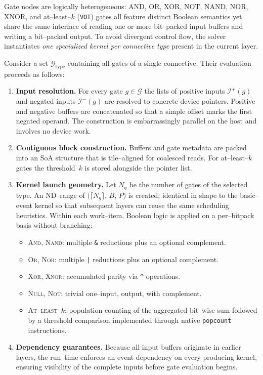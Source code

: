 Gate nodes are logically heterogeneous: AND, OR, XOR, NOT, NAND, NOR, XNOR, and
at--least--$k$ (\texttt{VOT}) gates all feature distinct Boolean semantics yet
share the same interface of reading one or more bit--packed input buffers and
writing a bit--packed output.  To avoid divergent control flow, the solver
instantiates \emph{one specialized kernel per connective type} present in the
current layer.

Consider a set $\mathcal{G}_{\mathrm{type}}$ containing all gates of a single
connective.  Their evaluation proceeds as follows:
\begin{enumerate}
  \item \textbf{Input resolution.}  For every gate $g\in\mathcal{G}$ the lists
        of positive inputs $\mathcal{I}^+(g)$ and negated inputs
        $\mathcal{I}^-(g)$ are resolved to concrete device pointers.  Positive
        and negative buffers are concatenated so that a simple offset marks the
        first negated operand.  The construction is embarrassingly parallel on
        the host and involves no device work.
  \item \textbf{Contiguous block construction.}  Buffers and gate metadata are
        packed into an SoA structure that is tile--aligned for
        coalesced reads.  For at--least--$k$ gates the threshold~$k$ is stored
        alongside the pointer list.
  \item \textbf{Kernel launch geometry.}  Let $N_{\!g}$ be the number of gates
        of the selected type.  An ND--range of
        $\bigl(\lceil N_{\!g}\rceil,\,B,\,P\bigr)$ is created, identical in
        shape to the basic--event kernel so that subsequent layers can reuse
        the same scheduling heuristics.  Within each work--item, Boolean logic
        is applied on a per--bitpack basis without branching:
        \begin{itemize}
          \item \textsc{And}, \textsc{Nand}:  multiple \texttt{\&} reductions
                plus an optional complement.
          \item \textsc{Or}, \textsc{Nor}:   multiple \texttt{|} reductions
                plus an optional complement.
          \item \textsc{Xor}, \textsc{Xnor}: accumulated parity via \texttt{\^{}} operations.
          \item \textsc{Null}, \textsc{Not}: trivial one--input, output, with complement.
          \item \textsc{At--least--$k$}: population counting of the aggregated
                bit--wise sum followed by a threshold comparison implemented
                through native \texttt{popcount} instructions.
        \end{itemize}
  \item \textbf{Dependency guarantees.}  Because all input buffers originate in
        earlier layers, the run--time enforces an event dependency on every
        producing kernel, ensuring visibility of the complete inputs before
        gate evaluation begins.
\end{enumerate}
